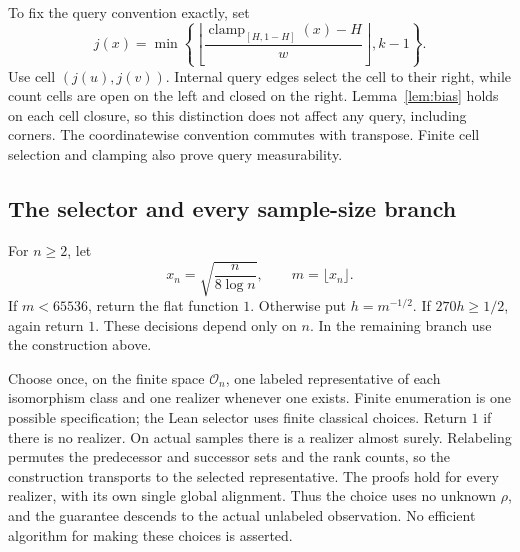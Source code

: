 \documentclass[11pt]{article}
\theoremstyle{remark}
\begin{document}
To fix the query convention exactly, set
\[
 j(x)=\min\left\{\left\lfloor\frac{\operatorname{clamp}_{[H,1-H]}(x)-H}{w}
                    \right\rfloor,k-1\right\}.
\]
Use cell $(j(u),j(v))$. Internal query edges select the cell to their
right, while count cells are open on the left and closed on the right.
Lemma~\ref{lem:bias} holds on each cell closure, so this distinction
does not affect any query, including corners. The coordinatewise
convention commutes with transpose. Finite cell selection and clamping
also prove query measurability.

\subsection{The selector and every sample-size branch}
For $n\ge2$, let
\begin{equation}\label{eq:outermesh}
 x_n=\sqrt{\frac{n}{8\log n}},\qquad m=\lfloor x_n\rfloor .
\end{equation}
If $m<65536$, return the flat function $1$. Otherwise put $h=m^{-1/2}$.
If $270h\ge1/2$, again return $1$. These decisions depend only on $n$.
In the remaining branch use the construction above.

Choose once, on the finite space $\mathcal O_n$, one labeled
representative of each isomorphism class and one realizer whenever
one exists. Finite enumeration is one possible specification; the Lean
selector uses finite classical choices. Return $1$ if there is no
realizer. On actual samples there is a realizer almost surely.
Relabeling permutes the predecessor and successor sets and the rank
counts, so the construction transports to the selected representative.
The proofs hold for every realizer, with its own single global
alignment. Thus the choice uses no unknown $\rho$, and the guarantee
descends to the actual unlabeled observation. No efficient algorithm
for making these choices is asserted.
\end{document}
